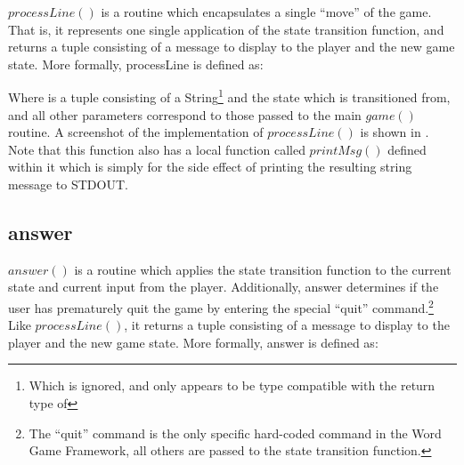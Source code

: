 \(processLine()\) is a routine which encapsulates a single ``move'' of the game.  That is, it represents one single application of the state transition function, and returns a tuple consisting of a message to display to the player and the new game state.  More formally, processLine is defined as:


Where  is a tuple consisting of a String\footnote{Which is ignored, and only appears to be type compatible with the return type of } and the state which is transitioned from, and all other parameters correspond to those passed to the main \(game()\) routine.  A screenshot of the implementation of \(processLine()\) is shown in .  Note that this function also has a local function called \(printMsg()\) defined within it which is simply for the side effect of printing the resulting string message to STDOUT.


\subsection{answer}

\(answer()\) is a routine which applies the state transition function to the current state and current input from the player.  Additionally, answer determines if the user has prematurely quit the game by entering the special ``quit'' command.\footnote{The ``quit'' command is the only specific hard-coded command in the Word Game Framework, all others are passed to the state transition function.}  Like \(processLine()\), it returns a tuple consisting of a message to display to the player and the new game state.  More formally, answer is defined as:


